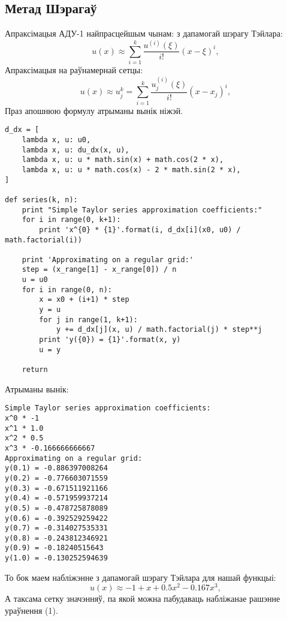 \subsection*{Метад Шэрагаў}

Апраксімацыя АДУ-1 найпрасцейшым чынам: з дапамогай шэрагу Тэйлара:\\
$$ u(x) \approx \sum_{i=1}^{k} \frac{u^{(i)}(\xi)}{i!}(x-\xi)^{i}, $$
Апраксімацыя на раўнамернай сетцы:
$$ u(x) \approx u_j^k = \sum_{i=1}^{k} \frac{u_j^{(i)}(\xi)}{i!}(x-x_j)^{i}, $$
Праз апошнюю формулу атрыманы вынік ніжэй.

\begin{verbatim}
d_dx = [
    lambda x, u: u0,
    lambda x, u: du_dx(x, u),
    lambda x, u: u * math.sin(x) + math.cos(2 * x),
    lambda x, u: u * math.cos(x) - 2 * math.sin(2 * x),
]

def series(k, n):
    print "Simple Taylor series approximation coefficients:"
    for i in range(0, k+1):
        print 'x^{0} * {1}'.format(i, d_dx[i](x0, u0) / math.factorial(i))

    print 'Approximating on a regular grid:'
    step = (x_range[1] - x_range[0]) / n
    u = u0
    for i in range(0, n):
        x = x0 + (i+1) * step
        y = u
        for j in range(1, k+1):
            y += d_dx[j](x, u) / math.factorial(j) * step**j
        print 'y({0}) = {1}'.format(x, y)
        u = y

    return
\end{verbatim}

Атрыманы вынік:

\begin{verbatim}
Simple Taylor series approximation coefficients:
x^0 * -1
x^1 * 1.0
x^2 * 0.5
x^3 * -0.166666666667
Approximating on a regular grid:
y(0.1) = -0.886397008264
y(0.2) = -0.776603071559
y(0.3) = -0.671511921166
y(0.4) = -0.571959937214
y(0.5) = -0.478725878089
y(0.6) = -0.392529259422
y(0.7) = -0.314027535331
y(0.8) = -0.243812346921
y(0.9) = -0.18240515643
y(1.0) = -0.130252594639
\end{verbatim}

То бок маем набліжэнне з дапамогай шэрагу Тэйлара для нашай функцыі:
$$ u(x) \approx -1 + x + 0.5x^2 - 0.167x^3,$$
А таксама сетку значэнняў, па якой можна пабудаваць набліжанае рашэнне ураўнення (1).
